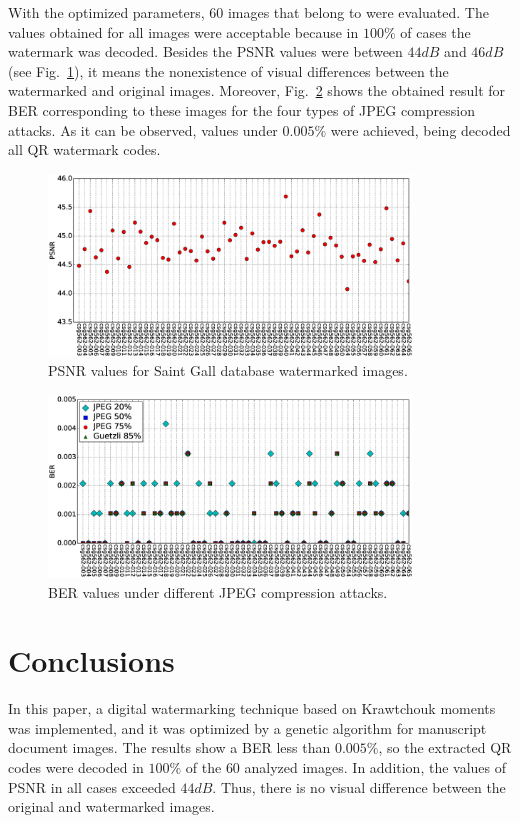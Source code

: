 \documentclass[runningheads]{llncs}
\begin{document}
	With the optimized parameters, $60$ images that belong to \cite{fischer2011transcription} were evaluated. The values obtained  for all images were acceptable because in $100\%$ of cases the watermark was decoded. Besides the PSNR values were between $44dB$ and $46dB$ (see Fig.~\ref{psnr}), it means the nonexistence of visual differences between the watermarked and original images. Moreover, Fig.~\ref{ber} shows the obtained result for BER corresponding to these images for the four types of JPEG compression attacks. As it can be observed, values under $0.005 \%$ were achieved, being decoded all QR watermark codes.	
\begin{figure}[t]	%
	\begin{center}
		\includegraphics[width=0.86\textwidth]{psnr.eps}
	\end{center}
	\caption{PSNR values for Saint Gall database watermarked images.}
	\label{psnr}
\end{figure}
\begin{figure}[H]	%
	\begin{center}
			\includegraphics[width=0.86\textwidth]{ber.eps}
	\end{center}
	\caption{BER values under different JPEG compression attacks.}
	\label{ber}
\end{figure}
\section*{Conclusions}
In this paper, a digital watermarking technique based on Krawtchouk moments was implemented, and it was optimized by a genetic algorithm for manuscript document images. The results show a BER less than $0.005 \%$, so the extracted QR codes were decoded in $100\%$ of the $60$ analyzed images. In addition, the values of PSNR in all cases exceeded $44dB$. Thus, there is no visual difference between the original and watermarked images.
\end{document}
